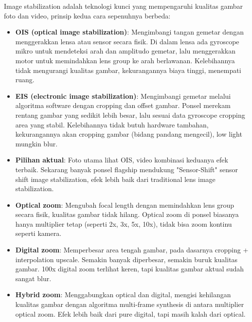 
Image stabilization adalah teknologi kunci yang mempengaruhi kualitas gambar foto dan video, prinsip kedua cara sepenuhnya berbeda:

\begin{itemize}
  \item \textbf{OIS (optical image stabilization)}: Mengimbangi tangan gemetar dengan menggerakkan lensa atau sensor secara fisik. Di dalam lensa ada gyroscope mikro untuk mendeteksi arah dan amplitudo gemetar, lalu menggerakkan motor untuk memindahkan lens group ke arah berlawanan. Kelebihannya tidak mengurangi kualitas gambar, kekurangannya biaya tinggi, menempati ruang.
  \item \textbf{EIS (electronic image stabilization)}: Mengimbangi gemetar melalui algoritma software dengan cropping dan offset gambar. Ponsel merekam rentang gambar yang sedikit lebih besar, lalu sesuai data gyroscope cropping area yang stabil. Kelebihannya tidak butuh hardware tambahan, kekurangannya akan cropping gambar (bidang pandang mengecil), low light mungkin blur.
  \item \textbf{Pilihan aktual}: Foto utama lihat OIS, video kombinasi keduanya efek terbaik. Sekarang banyak ponsel flagship mendukung "Sensor-Shift" sensor shift image stabilization, efek lebih baik dari traditional lens image stabilization.
\end{itemize}


\begin{itemize}
  \item \textbf{Optical zoom}: Mengubah focal length dengan memindahkan lens group secara fisik, kualitas gambar tidak hilang. Optical zoom di ponsel biasanya hanya multiplier tetap (seperti 2x, 3x, 5x, 10x), tidak bisa zoom kontinu seperti kamera.
  \item \textbf{Digital zoom}: Memperbesar area tengah gambar, pada dasarnya cropping + interpolation upscale. Semakin banyak diperbesar, semakin buruk kualitas gambar. 100x digital zoom terlihat keren, tapi kualitas gambar aktual sudah sangat blur.
  \item \textbf{Hybrid zoom}: Menggabungkan optical dan digital, mengisi kehilangan kualitas gambar dengan algoritma multi-frame synthesis di antara multiplier optical zoom. Efek lebih baik dari pure digital, tapi masih kalah dari optical.
\end{itemize}

